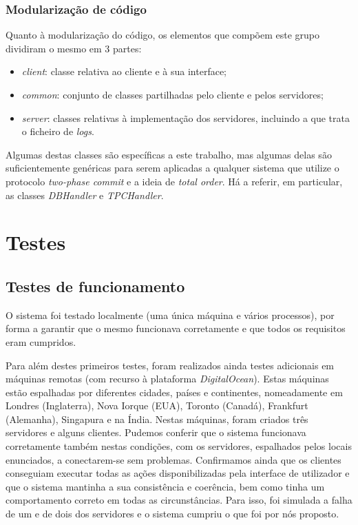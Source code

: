 \documentclass[a4paper]{report}
\begin{document}
		\subsection{Modularização de código}
		
		Quanto à modularização do código, os elementos que compõem este grupo dividiram o mesmo em 3 partes:
		\begin{itemize}
			\item \textit{client}: classe relativa ao cliente e à sua interface;
			\item \textit{common}: conjunto de classes partilhadas pelo cliente e pelos servidores;
			\item \textit{server}: classes relativas à implementação dos servidores, incluindo a que trata o ficheiro de \textit{logs}.
		\end{itemize}
		Algumas destas classes são específicas a este trabalho, mas algumas delas são suficientemente genéricas para serem aplicadas a qualquer sistema que utilize o protocolo \textit{two-phase commit} e a ideia de \textit{total order}. Há a referir, em particular, as classes \textit{DBHandler} e \textit{TPCHandler}.

\chapter{Testes}
	\section{Testes de funcionamento}
		O sistema foi testado localmente (uma única máquina e vários processos), por forma a garantir que o mesmo funcionava corretamente e que todos os requisitos eram cumpridos.

		Para além destes primeiros testes, foram realizados ainda testes adicionais em máquinas remotas (com recurso à plataforma \textit{DigitalOcean}). Estas máquinas estão espalhadas por diferentes cidades, países e continentes, 
		nomeadamente em Londres (Inglaterra), Nova Iorque (EUA), Toronto (Canadá), Frankfurt (Alemanha), Singapura e na Índia.
		Nestas máquinas, foram criados três servidores e alguns clientes. 
		Pudemos conferir que o sistema funcionava corretamente também nestas condições, com os servidores, espalhados pelos locais enunciados, a conectarem-se sem problemas.
		Confirmamos ainda que os clientes conseguiam executar todas as ações disponibilizadas pela interface de utilizador e que o sistema mantinha a sua consistência e coerência, 
		bem como tinha um comportamento correto em todas as circunstâncias. Para isso, foi simulada a falha de um e de dois dos servidores e o sistema cumpriu o que foi por nós proposto.
\end{document}
